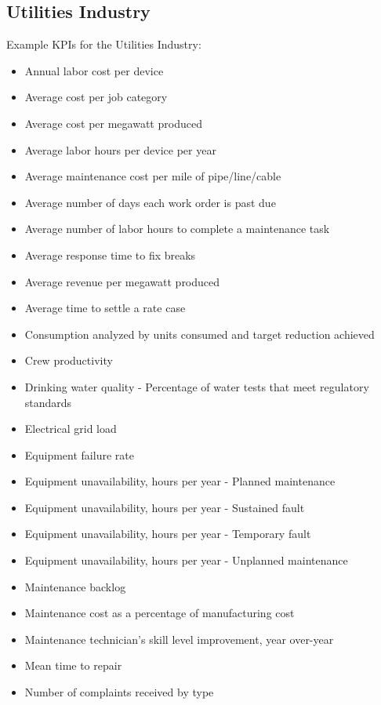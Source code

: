 \documentclass[]{book}
\providecommand{\tightlist}{%
  \setlength{\itemsep}{0pt}\setlength{\parskip}{0pt}}
\begin{document}
\subsection{Utilities Industry}\label{utilities-industry}

Example KPIs for the Utilities Industry:

\begin{itemize}
\tightlist
\item
  Annual labor cost per device
\item
  Average cost per job category
\item
  Average cost per megawatt produced
\item
  Average labor hours per device per year
\item
  Average maintenance cost per mile of pipe/line/cable
\item
  Average number of days each work order is past due
\item
  Average number of labor hours to complete a maintenance task
\item
  Average response time to fix breaks
\item
  Average revenue per megawatt produced
\item
  Average time to settle a rate case
\item
  Consumption analyzed by units consumed and target reduction achieved
\item
  Crew productivity
\item
  Drinking water quality - Percentage of water tests that meet
  regulatory standards
\item
  Electrical grid load
\item
  Equipment failure rate
\item
  Equipment unavailability, hours per year - Planned maintenance
\item
  Equipment unavailability, hours per year - Sustained fault
\item
  Equipment unavailability, hours per year - Temporary fault
\item
  Equipment unavailability, hours per year - Unplanned maintenance
\item
  Maintenance backlog
\item
  Maintenance cost as a percentage of manufacturing cost
\item
  Maintenance technician's skill level improvement, year over-year
\item
  Mean time to repair
\item
  Number of complaints received by type

\end{itemize}
\end{document}

